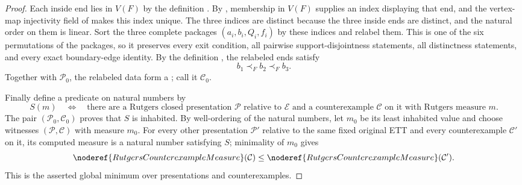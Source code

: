 \begin{proof}
Each inside end lies in \(V(F)\) by the definition
.  By , membership
in \(V(F)\) supplies an index displaying that end, and the vertex-map
injectivity field of  makes this index unique.
The three indices are distinct because the three inside ends are
distinct, and the natural order on them is linear.  Sort the three
complete packages
\((a_i,b_i,Q_i,f_i)\) by these indices and relabel them.  This is one of
the six permutations of the packages, so it preserves every exit
condition, all pairwise support-disjointness statements, all distinctness
statements, and every exact boundary-edge identity.  By the definition
, the relabeled ends satisfy
\[
                              b_1\prec_F b_2\prec_F b_3.
\]
Together with \(\mathcal P_0\), the relabeled data form a
; call it \(\mathcal C_0\).

Finally define a predicate on natural numbers by
\[
 S(m)\quad\Longleftrightarrow\quad
 \text{there are a Rutgers closed presentation \(\mathcal P\) relative
 to \(\mathcal E\) and a counterexample \(\mathcal C\) on it with
 Rutgers measure \(m\)}.
\]
The pair \((\mathcal P_0,\mathcal C_0)\) proves that \(S\) is inhabited.
By well-ordering of the natural numbers, let \(m_0\) be its least
inhabited value and choose witnesses
\((\mathcal P,\mathcal C)\) with measure \(m_0\).  For every other
presentation \(\mathcal P'\) relative to the same fixed original ETT and
every counterexample \(\mathcal C'\) on it, its computed measure is a
natural number satisfying \(S\); minimality of \(m_0\) gives
\[
 \noderef{RutgersCounterexampleMeasure}(\mathcal C)
 \leq
 \noderef{RutgersCounterexampleMeasure}(\mathcal C').
\]
This is the asserted global minimum over presentations and
counterexamples.
\end{proof}
